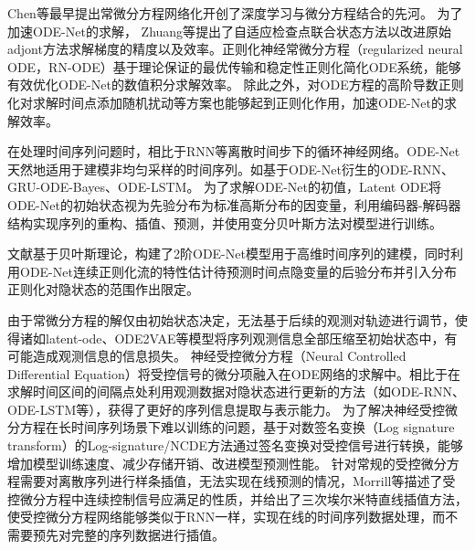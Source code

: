 Chen等最早提出常微分方程网络化\cite{chen2018neural}开创了深度学习与微分方程结合的先河。
为了加速ODE-Net的求解，
Zhuang等\cite{Zhuang2020}提出了自适应检查点联合状态方法以改进原始adjont方法求解梯度的精度以及效率。正则化神经常微分方程（regularized neural ODE，RN-ODE）\cite{J2020}基于理论保证的最优传输和稳定性正则化简化ODE系统，能够有效优化ODE-Net的数值积分求解效率。
除此之外，对ODE方程的高阶导数正则化\cite{kelly2020}对求解时间点添加随机扰动\cite{Ghosh2020}等方案也能够起到正则化作用，加速ODE-Net的求解效率。

在处理时间序列问题时，相比于RNN等离散时间步下的循环神经网络。ODE-Net天然地适用于建模非均匀采样的时间序列。如基于ODE-Net衍生的ODE-RNN\cite{10.5555/3454287.3454765}、GRU-ODE-Bayes\cite{brouwer2019gru}、ODE-LSTM\cite{lechner2020learning}。
为了求解ODE-Net的初值，Latent ODE\cite{10.5555/3454287.3454765}将ODE-Net的初始状态视为先验分布为标准高斯分布的因变量，利用编码器-解码器结构实现序列的重构、插值、预测，并使用变分贝叶斯方法对模型进行训练。

文献\cite{Yildiz2019}基于贝叶斯理论，构建了2阶ODE-Net模型用于高维时间序列的建模，同时利用ODE-Net连续正则化流的特性估计待预测时间点隐变量的后验分布并引入分布正则化对隐状态的范围作出限定。

由于常微分方程的解仅由初始状态决定，无法基于后续的观测对轨迹进行调节，使得诸如latent-ode、ODE2VAE等模型将序列观测信息全部压缩至初始状态中，有可能造成观测信息的信息损失。
神经受控微分方程（Neural Controlled Differential Equation）\cite{kidger2020neural}将受控信号的微分项融入在ODE网络的求解中。相比于在求解时间区间的间隔点处利用观测数据对隐状态进行更新的方法（如ODE-RNN、ODE-LSTM等），获得了更好的序列信息提取与表示能力。
为了解决神经受控微分方程在长时间序列场景下难以训练的问题，基于对数签名变换（Log signature transform）的Log-signature/NCDE方法\cite{morrill2021neural}通过签名变换对受控信号进行转换，能够增加模型训练速度、减少存储开销、改进模型预测性能。
针对常规的受控微分方程需要对离散序列进行样条插值，无法实现在线预测的情况，Morrill等\cite{morrill2021online}描述了受控微分方程中连续控制信号应满足的性质，并给出了三次埃尔米特直线插值方法，使受控微分方程网络能够类似于RNN一样，实现在线的时间序列数据处理，而不需要预先对完整的序列数据进行插值。

